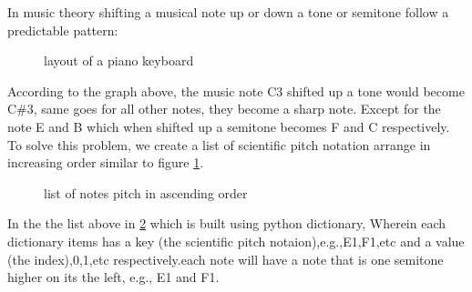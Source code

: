 \documentclass[final]{cvpr}
\begin{document}
In music theory shifting a musical note up or down a tone or semitone follow a
predictable pattern:

\begin{figure}[h]
    \caption{layout of a piano keyboard}
    \label{piano_keyboard}
\end{figure}

According to the graph above, the music note C3 shifted up a tone would become
C\#3, same goes for all other notes, they become a sharp note. Except for the note
E and B which when shifted up a semitone becomes F and C respectively.\\

To solve this problem, we create a list of scientific pitch notation arrange in
increasing order similar to figure \ref{piano_keyboard}.\\

\begin{figure}[H]
\noindent{}
\caption{list of notes pitch in ascending order}
\label{list: note pitch increase}
\end{figure}


In the the list above in \ref{list: note pitch increase} which is built using python
dictionary, Wherein each dictionary items has a key (the scientific pitch
notaion),e.g.,E1,F1,etc and a value (the index),0,1,etc respectively.each
note will have a note that is one semitone higher on its the left, e.g., E1 and F1.
\end{document}
